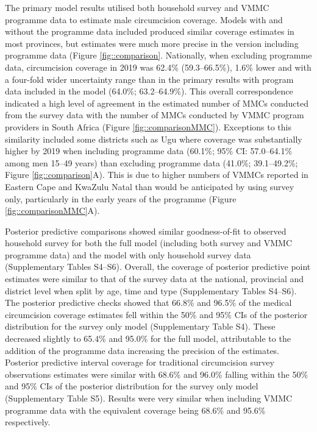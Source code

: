 \documentclass{article}
\begin{document}
The primary model results utilised both household survey and VMMC programme data to estimate male circumcision coverage. Models with and without the programme data included produced similar coverage estimates in most provinces, but estimates were much more precise in the version including programme data  (Figure \ref{fig::comparison}. Nationally, when excluding programme data, circumcision coverage in 2019 was 62.4\% (59.3--66.5\%), 1.6\% lower and with a four-fold wider uncertainty range than in the primary results with program data included in the model (64.0\%; 63.2--64.9\%). This overall correspondence indicated a high level of agreement in the estimated number of MMCs conducted from the survey data with the number of MMCs conducted by VMMC program providers in South Africa (Figure \ref{fig::comparisonMMC}). Exceptions to this similarity included some districts such as Ugu where coverage was substantially higher by 2019 when including programme data (60.1\%; 95\% CI: 57.0--64.1\% among men 15--49 years) than excluding programme data (41.0\%; 39.1--49.2\%; Figure \ref{fig::comparison}A). This is due to higher numbers of VMMCs reported in Eastern Cape and KwaZulu Natal than would be anticipated by using survey only, particularly in the early years of the programme (Figure \ref{fig::comparisonMMC}A). 

Posterior predictive comparisons showed similar goodness-of-fit to observed household survey for both the full model (including both survey and VMMC programme data) and the model with only household survey data (Supplementary Tables S4--S6). Overall, the coverage of posterior predictive point estimates were similar to that of the survey data at the national, provincial and district level when split by age, time and type (Supplementary Tables S4--S6). The posterior predictive checks showed that 66.8\% and 96.5\% of the medical circumcision coverage estimates fell within the 50\% and 95\% CIs of the posterior distribution for the survey only model (Supplementary Table S4). These decreased slightly to 65.4\% and 95.0\% for the full model, attributable to the addition of the programme data increasing the precision of the estimates.  Posterior predictive interval coverage for traditional circumcision survey observations estimates were similar with 68.6\% and 96.0\% falling within the 50\% and 95\% CIs of the posterior distribution for the survey only model (Supplementary Table S5). Results were very similar when including VMMC programme data with the equivalent coverage being 68.6\% and 95.6\% respectively. 
\end{document}
